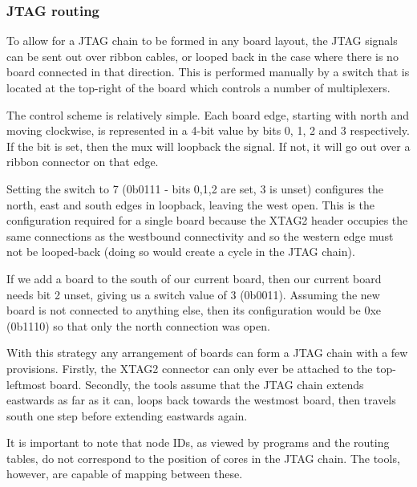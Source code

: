 \documentclass[12pt,a4paper,final,twoside]{article}
\begin{document}
\subsubsection{JTAG routing}

To allow for a JTAG chain to be formed in any board layout, the JTAG signals can be sent out over ribbon cables, or looped back in the case where there is no board connected in that direction. This is performed manually by a switch that is located at the top-right of the board which controls a number of multiplexers.

The control scheme is relatively simple. Each board edge, starting with north and moving clockwise, is represented in a 4-bit value by bits 0, 1, 2 and 3 respectively. If the bit is set, then the mux will loopback the signal. If not, it will go out over a ribbon connector on that edge.

Setting the switch to 7 (0b0111 - bits 0,1,2 are set, 3 is unset) configures the north, east and south edges in loopback, leaving the west open. This is the configuration required for a single board because the XTAG2 header occupies the same connections as the westbound connectivity and so the western edge must not be looped-back (doing so would create a cycle in the JTAG chain).

If we add a board to the south of our current board, then our current board needs bit 2 unset, giving us a switch value of 3 (0b0011). Assuming the new board is not connected to anything else, then its configuration would be 0xe (0b1110) so that only the north connection was open.

With this strategy any arrangement of boards can form a JTAG chain with a few provisions. Firstly, the XTAG2 connector can only ever be attached to the top-leftmost board. Secondly, the tools assume that the JTAG chain extends eastwards as far as it can, loops back towards the westmost board, then travels south one step before extending eastwards again.

It is important to note that node IDs, as viewed by programs and the routing tables, do not correspond to the position of cores in the JTAG chain. The tools, however, are capable of mapping between these.
\end{document}
